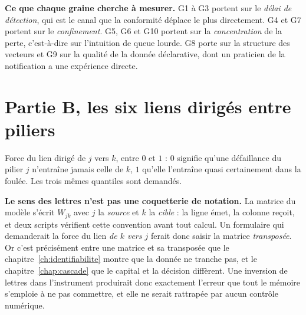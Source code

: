\vspace{2pt}
\noindent\textbf{Ce que chaque graine cherche à mesurer.} G1 à G3 portent sur le \emph{délai de
détection}, qui est le canal que la conformité déplace le plus directement. G4 et G7 portent sur
le \emph{confinement}. G5, G6 et G10 portent sur la \emph{concentration} de la perte, c'est-à-dire
sur l'intuition de queue lourde. G8 porte sur la structure des vecteurs et G9 sur la qualité de la
donnée déclarative, dont un praticien de la notification a une expérience directe.

\section*{Partie B, les six liens dirigés entre piliers}

Force du lien dirigé de $j$ vers $k$, entre $0$ et $1$ : $0$ signifie qu'une défaillance du
pilier $j$ n'entraîne jamais celle de $k$, $1$ qu'elle l'entraîne quasi certainement dans la
foulée. Les trois mêmes quantiles sont demandés.

\begin{attention}
\textbf{Le sens des lettres n'est pas une coquette\-rie de notation.} La matrice du modèle
s'écrit $W_{jk}$ avec $j$ la \emph{source} et $k$ la \emph{cible} : la ligne émet, la colonne
reçoit, et deux scripts vérifient cette convention avant tout calcul. Un formulaire qui
demanderait la force du lien \emph{de $k$ vers $j$} ferait donc saisir la matrice
\emph{transposée}. Or c'est précisément entre une matrice et sa transposée que le
chapitre~\ref{ch:identifiabilite} montre que la donnée ne tranche pas, et le
chapitre~\ref{chap:cascade} que le capital et la décision diffèrent. Une inversion de lettres
dans l'instrument produirait donc exactement l'erreur que tout le mémoire s'emploie à ne pas
commettre, et elle ne serait rattrapée par aucun contrôle numérique.
\end{attention}


